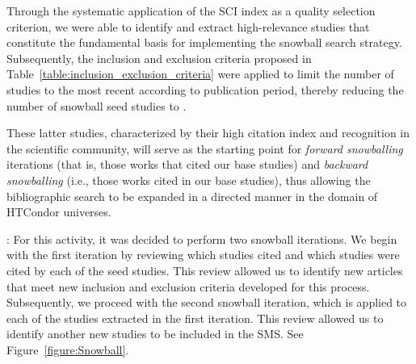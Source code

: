 Through the systematic application of the SCI index as a quality selection criterion, we were able to identify and extract \csiSelected{} high-relevance studies that constitute the fundamental basis for implementing the snowball search strategy. Subsequently, the inclusion and exclusion criteria proposed in Table~\ref{table:inclusion_exclusion_criteria} were applied to limit the number of studies to the most recent according to publication period, thereby reducing the number of snowball seed studies to \newSnowballStudies{}.

These latter studies, characterized by their high citation index and recognition in the scientific community, will serve as the starting point for \textit{forward snowballing} iterations (that is, those works that cited our base studies) and \textit{backward snowballing} (i.e., those works cited in our base studies), thus allowing the bibliographic search to be expanded in a directed manner in the domain of HTCondor universes.

: For this activity, it was decided to perform two snowball iterations. We begin with the first iteration by reviewing which studies cited and which studies were cited by each of the \newSnowballStudies{} seed studies. This review allowed us to identify \firstSnowballIterationStudies{} new articles that meet new inclusion and exclusion criteria developed for this process. Subsequently, we proceed with the second snowball iteration, which is applied to each of the \firstSnowballIterationStudies{} studies extracted in the first iteration. This review allowed us to identify another \secondSnowballIterationStudies{} new studies to be included in the SMS. See Figure~\ref{figure:Snowball}.\\



